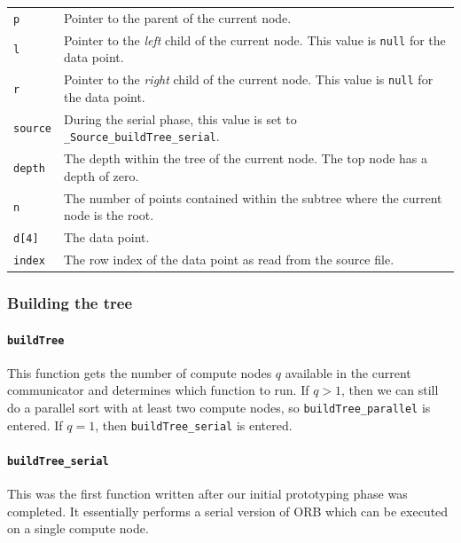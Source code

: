 \documentclass{article}
\begin{document}
\begin{tabular}{l l}
 \texttt{p} & Pointer to the parent of the current node.  \\
 \texttt{l} & Pointer to the \textit{left} child of the current node. This value is \texttt{null} for the data point.  \\
 \texttt{r} & Pointer to the \textit{right} child of the current node. This value is \texttt{null} for the data point.  \\
 \texttt{source} & During the serial phase, this value is set to \texttt{\_Source\_buildTree\_serial}.  \\
 \texttt{depth} & The depth within the tree of the current node. The top node has a depth of zero.  \\
 \texttt{n} & The number of points contained within the subtree where the current node is the root.  \\
 \texttt{d[4]} & The data point.  \\
 \texttt{index} & The row index of the data point as read from the source file.  \\
 \end{tabular}


%
%

\subsubsection{Building the tree}

\paragraph{\texttt{buildTree}}
This function gets the number of compute nodes $q$ available in the current communicator and determines which function to run. If $q>1$, then we can still do a parallel sort with at least two compute nodes, so \texttt{buildTree\_parallel} is entered. If $q=1$, then \texttt{buildTree\_serial} is entered.


%
%

\paragraph{\texttt{buildTree\_serial}}
This was the first function written after our initial prototyping phase was completed. It essentially performs a serial version of ORB which can be executed on a single compute node.
\end{document}
